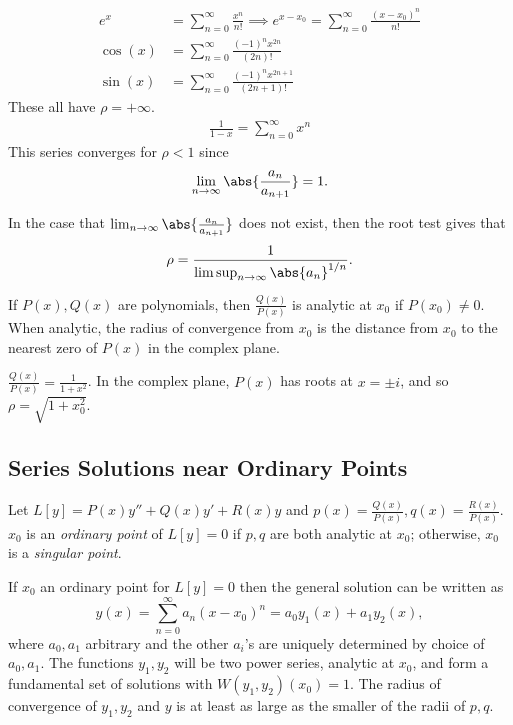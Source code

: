 \begin{example}
    \begin{align*}
        e^x &= \sum_{n=0}^\infty \frac{x^n}{n!} \implies e^{x - x_0} = \sum_{n=0}^\infty \frac{(x-x_0)^n}{n!}\\
        \cos(x) &= \sum_{n=0}^\infty \frac{(-1)^nx^{2n}}{(2n)!}\\
        \sin(x) &= \sum_{n=0}^\infty \frac{(-1)^n x^{2n+1}}{(2n+1)!}
    \end{align*}
    These all have $\rho = + \infty$.
    \begin{align*}
        \frac{1}{1-x} = \sum_{n = 0}^\infty x^n
    \end{align*}
    This series converges for $\rho < 1$ since \[
    \lim_{n \to \infty}  \abs{\frac{a_{n}}{a_{n+1}}} = 1.
    \]
\end{example}
\begin{remark}
In the case that $\lim_{n \to \infty} \abs{\frac{a_n}{a_{n+1}}}$ does not exist, then the root test gives that \[
\rho = \frac{1}{\limsup_{n \to \infty} \abs{a_n}^{1/n}}.
\]
\end{remark}

\begin{proposition}
    If $P(x), Q(x)$ are polynomials, then $\frac{Q(x)}{P(x)}$ is analytic at $x_0$ if $P(x_0) \neq 0$. When analytic, the radius of convergence from $x_0$ is the distance from $x_0$ to the nearest zero of $P(x)$ in the complex plane.
\end{proposition}
\begin{example}
    $\frac{Q(x)}{P(x)} = \frac{1}{1 + x^2}$. In the complex plane, $P(x)$ has roots at $x = \pm i$, and so $\rho = \sqrt{1 + x_0^2}$.
\end{example}

\subsection{Series Solutions near Ordinary Points}

\begin{definition}
    Let $L[y] = P(x)y'' + Q(x)y' + R(x)y$ and $p(x) = \frac{Q(x)}{P(x)}, q(x) = \frac{R(x)}{P(x)}$. $x_0$ is an \emph{ordinary point} of $L[y] = 0$ if $p, q$ are both analytic at $x_0$; otherwise, $x_0$ is a \emph{singular point}.
\end{definition}

\begin{theorem}
    If $x_0$ an ordinary point for $L[y]=0$ then the general solution can be written as \[
    y(x) = \sum_{n=0}^\infty a_n(x-x_0)^n = a_0y_1(x) + a_1 y_2(x),
    \]
    where $a_0, a_1$ arbitrary and the other $a_i$'s are uniquely determined by choice of $a_0, a_1$. The functions $y_1, y_2$ will be two power series, analytic at $x_0$, and form a fundamental set of solutions with $W(y_1, y_2)(x_0) = 1$. The radius of convergence of $y_1, y_2$ and $y$ is at least as large as the smaller of the radii of $p, q$.
\end{theorem}

